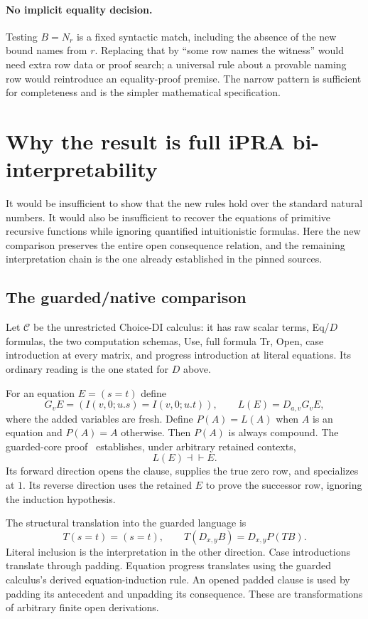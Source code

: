 \documentclass[11pt,letterpaper]{article}
\theoremstyle{definition}\newtheorem{definition}[theorem]{Definition}
\theoremstyle{remark}\newtheorem{remark}[theorem]{Remark}
\begin{document}
\paragraph{No implicit equality decision.}
Testing $B=N_r$ is a fixed syntactic match, including the absence of the new
bound names from $r$. Replacing that by ``some row names the witness'' would
need extra row data or proof search; a universal rule about a provable naming
row would reintroduce an equality-proof premise. The narrow pattern is
sufficient for completeness and is the simpler mathematical specification.


\section{Why the result is full iPRA bi-interpretability}
\label{sec:bridge}

It would be insufficient to show that the new rules hold over the standard
natural numbers. It would also be insufficient to recover the equations of
primitive recursive functions while ignoring quantified intuitionistic
formulas. Here the new comparison preserves the entire open consequence
relation, and the remaining interpretation chain is the one already
established in the pinned sources.

\subsection{The guarded/native comparison}

Let $\mathcal C$ be the unrestricted Choice-DI calculus: it has raw scalar
terms, Eq/$D$ formulas, the two computation schemas, Use, full formula Tr,
Open, case introduction at every matrix, and progress introduction at literal
equations. Its ordinary reading is the one stated for $D$ above.

For an equation $E=(s=t)$ define
\[
 G_vE=(I(v,0;u.s)=I(v,0;u.t)),\qquad
 L(E)=D_{a,v}G_vE,
\]
where the added variables are fresh. Define $P(A)=L(A)$ when $A$ is an
equation and $P(A)=A$ otherwise. Then $P(A)$ is always compound. The
guarded-core proof~\cite{guarded} establishes, under arbitrary retained
contexts,
\[
 L(E)\dashv\vdash E.
\]
Its forward direction opens the clause, supplies the true zero row, and
specializes at $1$. Its reverse direction uses the retained $E$ to prove the
successor row, ignoring the induction hypothesis.

The structural translation into the guarded language is
\[
 T(s=t)=(s=t),\qquad
 T(D_{x,y}B)=D_{x,y}P(TB).
\]
Literal inclusion is the interpretation in the other direction. Case
introductions translate through padding. Equation progress translates using
the guarded calculus's derived equation-induction rule. An opened padded
clause is used by padding its antecedent and unpadding its consequence.
These are transformations of arbitrary finite open derivations.
\end{document}

